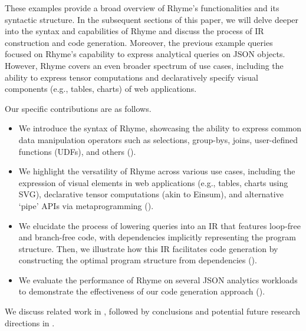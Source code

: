 \documentclass[runningheads]{llncs}
\newcommand{\lang}{Rhyme}
\begin{document}
These examples provide a broad overview of \lang{}'s functionalities and its
syntactic structure.
In the subsequent sections of this paper, we will delve deeper into the syntax and capabilities
of \lang{} and discuss the process of IR construction and code generation.
Moreover, the previous example queries focused on \lang{}'s capability to
express analytical queries on JSON objects.
However, \lang{} covers an even broader
spectrum of use cases, including the ability to express tensor computations and declaratively specify
visual components (e.g., tables, charts) of web applications.

Our specific contributions are as follows.
\begin{itemize}
    \item We introduce the syntax of \lang{}, showcasing the ability to express common data
          manipulation operators such as selections, group-bys, joins, user-defined functions (UDFs),
          and others ().
    \item We highlight the versatility of \lang{} across various use cases, including the expression
          of visual elements in web applications (e.g., tables, charts using SVG), declarative
          tensor computations (akin to Einsum), and alternative `pipe' APIs via metaprogramming ().
    \item We elucidate the process of lowering queries into an IR that features loop-free and
          branch-free code, with dependencies implicitly representing the program structure.
          Then, we illustrate how this IR facilitates code generation by constructing the optimal program
          structure from dependencies ().
    \item We evaluate the performance of \lang{} on several JSON analytics workloads
          to demonstrate the effectiveness of our code generation approach ().
\end{itemize} 

We discuss related work in , followed by conclusions and potential future research directions
in .


\vspace{-2mm}
\end{document}

